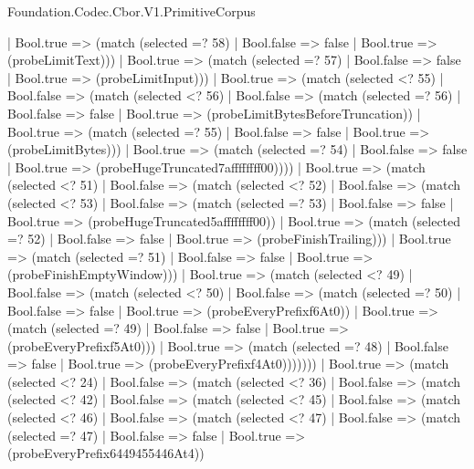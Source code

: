 \begin{lexlean}{Foundation.Codec.Cbor.V1.PrimitiveCorpus}
\begin{semanticmodule}
{                  | Bool.true => (match (selected =? 58)
                    | Bool.false => false
                    | Bool.true => (probeLimitText)))
                | Bool.true => (match (selected =? 57)
                  | Bool.false => false
                  | Bool.true => (probeLimitInput)))
              | Bool.true => (match (selected <? 55)
                | Bool.false => (match (selected <? 56)
                  | Bool.false => (match (selected =? 56)
                    | Bool.false => false
                    | Bool.true => (probeLimitBytesBeforeTruncation))
                  | Bool.true => (match (selected =? 55)
                    | Bool.false => false
                    | Bool.true => (probeLimitBytes)))
                | Bool.true => (match (selected =? 54)
                  | Bool.false => false
                  | Bool.true => (probeHugeTruncated7affffffff00))))
            | Bool.true => (match (selected <? 51)
              | Bool.false => (match (selected <? 52)
                | Bool.false => (match (selected <? 53)
                  | Bool.false => (match (selected =? 53)
                    | Bool.false => false
                    | Bool.true => (probeHugeTruncated5affffffff00))
                  | Bool.true => (match (selected =? 52)
                    | Bool.false => false
                    | Bool.true => (probeFinishTrailing)))
                | Bool.true => (match (selected =? 51)
                  | Bool.false => false
                  | Bool.true => (probeFinishEmptyWindow)))
              | Bool.true => (match (selected <? 49)
                | Bool.false => (match (selected <? 50)
                  | Bool.false => (match (selected =? 50)
                    | Bool.false => false
                    | Bool.true => (probeEveryPrefixf6At0))
                  | Bool.true => (match (selected =? 49)
                    | Bool.false => false
                    | Bool.true => (probeEveryPrefixf5At0)))
                | Bool.true => (match (selected =? 48)
                  | Bool.false => false
                  | Bool.true => (probeEveryPrefixf4At0)))))))
      | Bool.true => (match (selected <? 24)
        | Bool.false => (match (selected <? 36)
          | Bool.false => (match (selected <? 42)
            | Bool.false => (match (selected <? 45)
              | Bool.false => (match (selected <? 46)
                | Bool.false => (match (selected <? 47)
                  | Bool.false => (match (selected =? 47)
                    | Bool.false => false
                    | Bool.true => (probeEveryPrefix6449455446At4))
}
\end{semanticmodule}
\end{lexlean}
